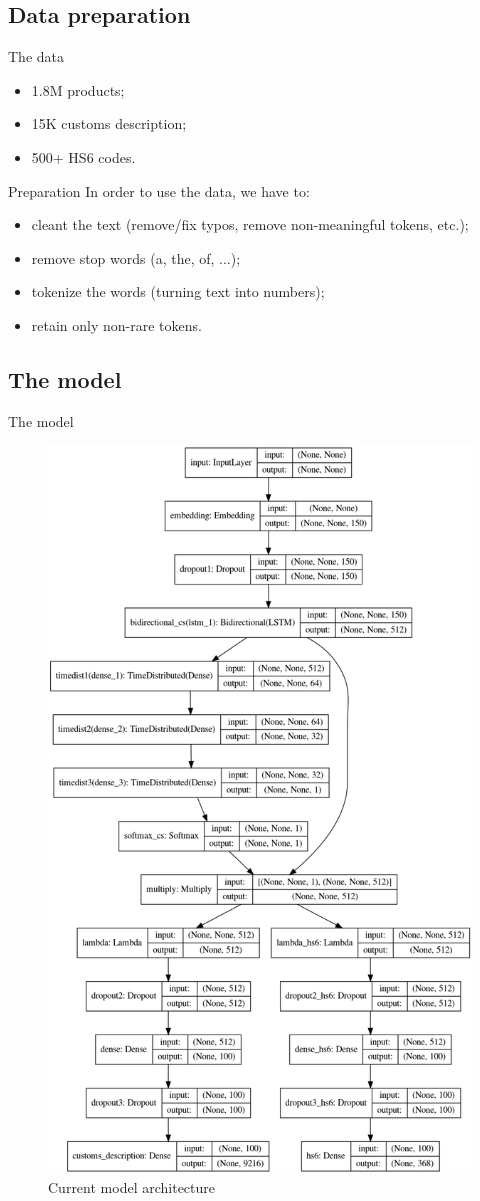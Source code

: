 \documentclass[9pt]{beamer}
\begin{document}
\subsection{Data preparation}
\begin{frame}{The data}
	\begin{itemize}
		\item 1.8M products;
		\item 15K customs description;
		\item 500+ HS6 codes.
	\end{itemize}
\end{frame}

\begin{frame}{Preparation}
	In order to use the data, we have to:
	\begin{itemize}
		\item cleant the text (remove/fix typos, remove non-meaningful tokens, etc.);
		\item remove stop words (a, the, of, ...);
		\item tokenize the words (turning text into numbers);
		\item retain only non-rare tokens.
	\end{itemize}
\end{frame}


\subsection{The model}
\begin{frame}{The model}
	\begin{figure}
		\includegraphics[height=0.6\textwidth]{imgs/model.png}
		\caption{Current model architecture}
	\end{figure}
\end{frame}
\end{document}
